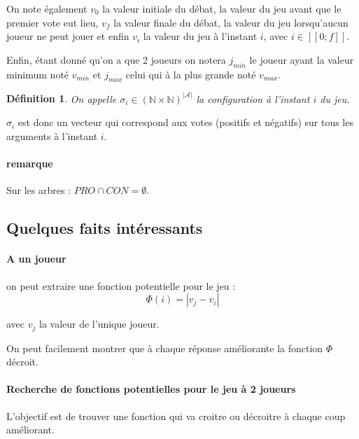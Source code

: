 \documentclass[12pt]{article}
\theoremstyle{defi}
\newtheorem{definition}{Définition}[section]
\theoremstyle{not}
\theoremstyle{prob}
\begin{document}
      On note également $v_0$ la valeur initiale du débat, la valeur du jeu avant que le premier vote eut lieu, $v_f$ la valeur finale du débat, la valeur du jeu lorsqu'aucun joueur ne peut jouer et enfin $v_i$ la valeur du jeu à l'instant $i$, avec $i \in [\![ 0;f ]\!]$.

      Enfin, étant donné qu'on a que 2 joueurs on notera $j_{min}$ le joueur ayant la valeur minimum noté $v_{min}$ et $j_{max}$ celui qui à la plus grande noté $v_{max}$.

      \begin{definition}
        On appelle $\sigma_i \in (\mathbb{N} \times \mathbb{N})^{|\mathcal{A}|}$ la configuration à l'instant $i$ du jeu.
      \end{definition}

      $\sigma_i$ est donc un vecteur qui correspond aux votes (positifs et négatifs) sur tous les arguments à l'instant $i$.

      \paragraph{remarque} Sur les arbres : $PRO \cap CON = \emptyset$.

    \subsection{Quelques faits intéressants}
      \paragraph{A un joueur} on peut extraire une fonction potentielle pour le jeu :
        $$ \Phi(i) = |v_j - v_i| $$

        avec $v_j$ la valeur de l'unique joueur.

        On peut facilement montrer que à chaque réponse améliorante la fonction $\Phi$ décroit.

      \paragraph{Recherche de fonctions potentielles pour le jeu à 2 joueurs}

        L'objectif est de trouver une fonction qui va croitre ou décroitre à chaque coup améliorant.
\end{document}
